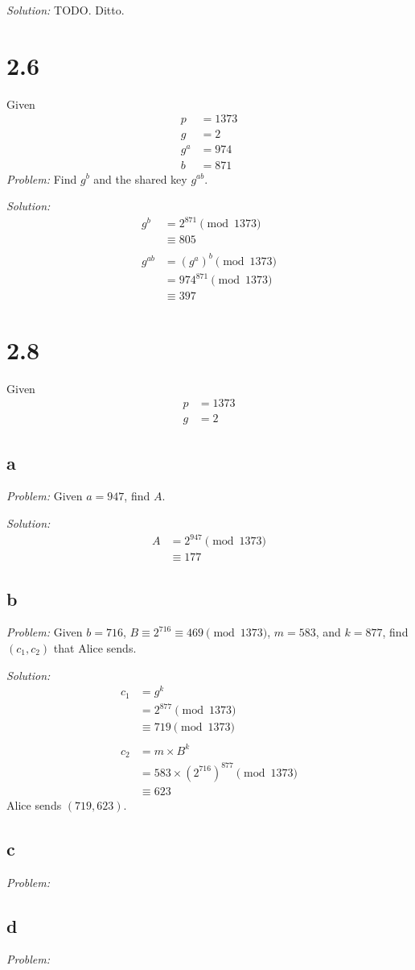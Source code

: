\documentclass[12pt]{article}
\begin{document}
\textit{Solution:} TODO. Ditto.

\section*{2.6}
Given
\begin{align*}
    p &= 1373 \\
    g &= 2 \\
    g^a &= 974 \\
    b &= 871
\end{align*}
\textit{Problem:} Find $g^b$ and the shared key $g^{ab}$.

\textit{Solution:}
\begin{align*}
    g^b &= 2^{871} \pmod{1373} \\
    &\equiv \boxed{805} \\
    \\
    g^{ab} &= (g^a)^b \pmod{1373} \\
    &= 974^{871} \pmod{1373} \\
    &\equiv \boxed{397}
\end{align*}

\section*{2.8}
Given
\begin{align*}
    p &= 1373 \\
    g &= 2
\end{align*}

\subsection*{a}
\textit{Problem:} Given $a = 947$, find $A$.

\textit{Solution:}
\begin{align*}
    A &= 2^{947} \pmod{1373} \\
    &\equiv \boxed{177}
\end{align*}

\subsection*{b}
\textit{Problem:} Given $b = 716$, $B \equiv 2^{716} \equiv 469 \pmod{1373}$, $m = 583$, and $k = 877$, find $(c_1, c_2)$ that Alice sends.

\textit{Solution:}
\begin{align*}
    c_1 &= g^k \\
    &= 2^{877} \pmod{1373} \\
    &\equiv 719 \pmod{1373} \\
    \\
    c_2 &= m \times B^k \\
    &= 583 \times (2^{716})^{877} \pmod{1373} \\
    &\equiv 623
\end{align*}
Alice sends $\boxed{(719, 623)}$.

\subsection*{c}
\textit{Problem:}

\subsection*{d}
\textit{Problem:}
\end{document}
